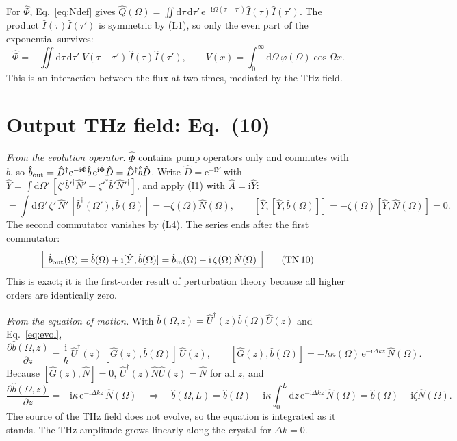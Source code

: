 \documentclass[aps,pra,onecolumn,notitlepage,11pt,amsmath,amssymb,nofootinbib]{revtex4-2}
\newcommand{\Nop}{\hat N}
\newcommand{\Iop}{\hat I}
\newcommand{\Qop}{\hat Q}
\newcommand{\dd}{\mathrm{d}}
\newcommand{\ee}{\mathrm{e}}
\newcommand{\ii}{\mathrm{i}}
\newcommand{\TN}[1]{\text{TN\,#1}}
\begin{document}
For $\hat\Phi$, Eq.~\eqref{eq:Ndef} gives
$\Qop(\Omega)=\iint\dd\tau\,\dd\tau'\,\ee^{-\ii\Omega(\tau-\tau')}\Iop(\tau)\Iop(\tau')$.
The product $\Iop(\tau)\Iop(\tau')$ is symmetric by (L1), so only the even
part of the exponential survives:
\begin{equation}
\hat\Phi=-\iint\!\dd\tau\,\dd\tau'\;V(\tau-\tau')\,\Iop(\tau)\Iop(\tau'),\qquad
V(x)=\int_0^\infty\!\!\dd\Omega\,\varphi(\Omega)\cos\Omega x .
\label{eq:PhiV}
\end{equation}
This is an interaction between the flux at two times, mediated by the THz
field.

\section{Output THz field: Eq.~(10)}
\label{sec:b}

\emph{From the evolution operator.} $\hat\Phi$ contains pump operators only
and commutes with $\hat b$, so
$\hat b_{\rm out}=\hat D^\dagger\ee^{-\ii\hat\Phi}\hat b\,\ee^{\ii\hat\Phi}\hat D
=\hat D^\dagger\hat b\hat D$. Write $\hat D=\ee^{-\ii\hat Y}$ with
$\hat Y=\int\dd\Omega'\,[\zeta'\hat b'^\dagger\Nop'+\zeta'^*\hat b'\Nop'^\dagger]$,
and apply (I1) with $\hat A=\ii\hat Y$:
\begin{equation}
[\hat Y,\hat b(\Omega)]=\int\!\dd\Omega'\,\zeta'\,\Nop'\,[\hat b^\dagger(\Omega'),\hat b(\Omega)]
=-\zeta(\Omega)\Nop(\Omega),\qquad
[\hat Y,[\hat Y,\hat b(\Omega)]]=-\zeta(\Omega)[\hat Y,\Nop(\Omega)]=0 .
\end{equation}
The second commutator vanishes by (L4). The series ends after the first
commutator:
\begin{equation}
\boxed{\;\hat b_{\rm out}(\Omega)=\hat b(\Omega)+\ii[\hat Y,\hat b(\Omega)]
=\hat b_{\rm in}(\Omega)-\ii\,\zeta(\Omega)\,\Nop(\Omega)\;}
\tag{\TN{10}}
\end{equation}
This is exact; it is the first-order result of perturbation theory because
all higher orders are identically zero.

\emph{From the equation of motion.} With
$\hat b(\Omega,z)=\hat U^\dagger(z)\hat b(\Omega)\hat U(z)$ and
Eq.~\eqref{eq:evol},
\begin{equation}
\frac{\partial\hat b(\Omega,z)}{\partial z}
=\frac{\ii}{\hbar}\,\hat U^\dagger(z)\,[\hat G(z),\hat b(\Omega)]\,\hat U(z),
\qquad
[\hat G(z),\hat b(\Omega)]=-\hbar\kappa(\Omega)\,\ee^{-\ii\Delta kz}\,\Nop(\Omega).
\end{equation}
Because $[\hat G(z),\Nop]=0$, $\hat U^\dagger(z)\Nop\hat U(z)=\Nop$ for all
$z$, and
\begin{equation}
\frac{\partial\hat b(\Omega,z)}{\partial z}=-\ii\kappa\,\ee^{-\ii\Delta kz}\,\Nop(\Omega)
\quad\Longrightarrow\quad
\hat b(\Omega,L)=\hat b(\Omega)-\ii\kappa\int_0^L\!\!\dd z\,\ee^{-\ii\Delta kz}\,\Nop(\Omega)
=\hat b(\Omega)-\ii\zeta\Nop(\Omega).
\end{equation}
The source of the THz field does not evolve, so the equation is integrated as
it stands. The THz amplitude grows linearly along the crystal for
$\Delta k=0$.
\end{document}
